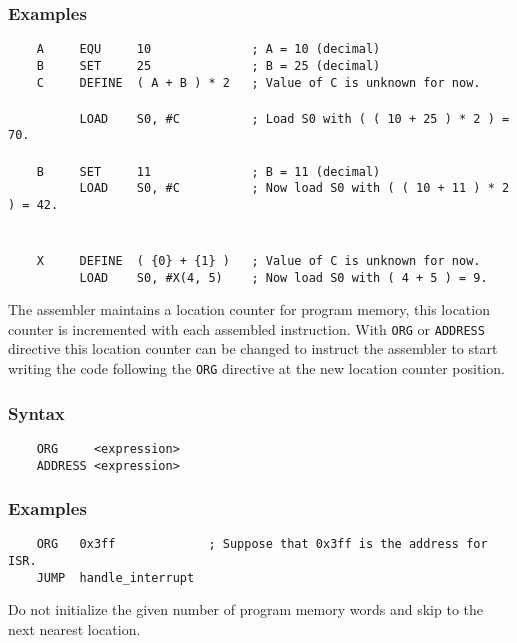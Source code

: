     \subsubsection{Examples}
        \verb'    A     EQU     10              ; A = 10 (decimal)'\\
        \verb'    B     SET     25              ; B = 25 (decimal)'\\
        \verb'    C     DEFINE  ( A + B ) * 2   ; Value of C is unknown for now.'\\
        \verb''\\
        \verb'          LOAD    S0, #C          ; Load S0 with ( ( 10 + 25 ) * 2 ) = 70.'\\
        \verb''\\
        \verb'    B     SET     11              ; B = 11 (decimal)'\\
        \verb'          LOAD    S0, #C          ; Now load S0 with ( ( 10 + 11 ) * 2 ) = 42.'\\
        \verb''\\
        \verb''\\
        \verb'    X     DEFINE  ( {0} + {1} )   ; Value of C is unknown for now.'\\
        \verb'          LOAD    S0, #X(4, 5)    ; Now load S0 with ( 4 + 5 ) = 9.'

    The assembler maintains a location counter for program memory, this location counter is incremented with each assembled instruction. With \texttt{ORG} or \texttt{ADDRESS} directive this location counter can be changed to instruct the assembler to start writing the code following the \texttt{ORG} directive at the new location counter position.

    \subsubsection{Syntax}
        \verb'    ORG     <expression>'\\
        \verb'    ADDRESS <expression>'


    \subsubsection{Examples}
        \verb'    ORG   0x3ff             ; Suppose that 0x3ff is the address for ISR.'\\
        \verb'    JUMP  handle_interrupt'

    Do not initialize the given number of program memory words and skip to the next nearest location.

